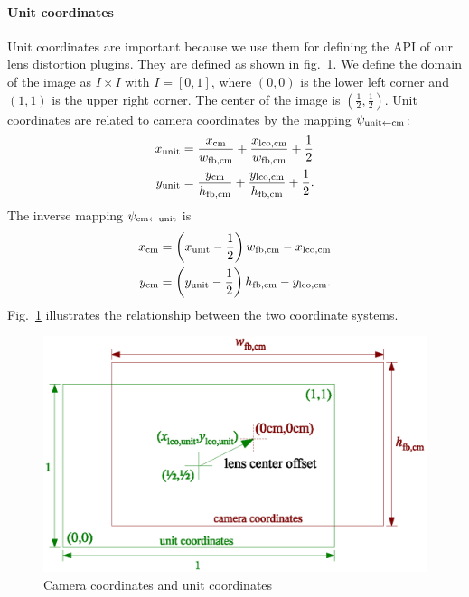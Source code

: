 \documentclass[10pt,a4paper]{article}
\begin{document}
\paragraph{Unit coordinates}
\label{UnitCoordinates}
Unit coordinates are important because we use them for
defining the API of our lens distortion plugins.
They are defined as shown in fig.~\ref{fig:CoordinatesCameraVsUnit}.
We define the domain of the image as $I\times I$ with $I=[0,1]$, where $(0,0)$ is the lower left corner
and $(1,1)$ is the upper right corner. The center of the image is $(\frac 1 2,\frac 1 2)$.
Unit coordinates are related to camera coordinates by the mapping $\psi_{\mathrm{unit}\leftarrow\mathrm{cm}}$:
\begin{align}
\label{eq:DefinitionCmToUnit}
x_{\mathrm{unit}} &= \frac {x_{\mathrm{cm}}} {w_{\mathrm{fb,cm}}} + \frac {x_{\mathrm{lco,cm}}} {w_{\mathrm{fb,cm}}} + \frac 1 2 \nonumber\\
y_{\mathrm{unit}} &= \frac {y_{\mathrm{cm}}} {h_{\mathrm{fb,cm}}} + \frac {y_{\mathrm{lco,cm}}} {h_{\mathrm{fb,cm}}} + \frac 1 2.
\end{align}
The inverse mapping $\psi_{\mathrm{cm}\leftarrow\mathrm{unit}}$ is
\begin{align}
\label{eq:DefinitionUnitToCm}
x_{\mathrm{cm}} &= \left(x_{\mathrm{unit}} - \frac 1 2\right) w_{\mathrm{fb,cm}} - x_{\mathrm{lco,cm}} \nonumber\\
y_{\mathrm{cm}} &= \left(y_{\mathrm{unit}} - \frac 1 2\right) h_{\mathrm{fb,cm}} - y_{\mathrm{lco,cm}}.
\end{align}
Fig.~\ref{fig:CoordinatesCameraVsUnit} illustrates the relationship between
the two coordinate systems.
%
\begin{figure}[ht]
\centering
\includegraphics[width=12.5cm]{unit_coords_vs_camera_coords}
\caption{Camera coordinates and unit coordinates}
\label{fig:CoordinatesCameraVsUnit}
\end{figure}
%
\end{document}
